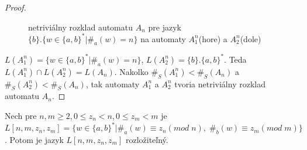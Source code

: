 \begin{proof}
\begin{figure}[H]
\caption{netriviálny rozklad automatu $ A_n $ pre jazyk $ \lbrace b \rbrace.\lbrace w \in \lbrace a,b \rbrace^{*} | \#_a(w)=n \rbrace $ na automaty $ A_1^n $(hore) a $ A_2^n $(dole)}
\label{fig:dec_ba^n}
\end{figure}

$ L(A_1^n) = \lbrace w \in \lbrace a,b \rbrace^{*} | \#_{a}(w) = n \rbrace $, $ L(A_2^n) = \lbrace b \rbrace.\lbrace a,b \rbrace^{*} $. Teda $ L(A_1^n) \cap L(A_2^n) = L(A_n) $.  Nakolko $ \#_{S}(A_1^n) < \#_{S}(A_n) $ a $ \#_{S}(A_2^n) < \#_{S}(A_n) $, tak automaty $ A_1^n $ a $ A_2^n $ tvoria netriviálny rozklad automatu $ A_n $.
\end{proof}

\begin{theorem}
\label{thm:nmz_nz_m}
Nech pre $ n,m \geq 2, 0 \leq z_n < n, 0 \leq z_m < m $ je $ L[n,m,z_n,z_m] = \lbrace w \in \lbrace a,b \rbrace^{*} | \#_a(w) \equiv z_n (mod \; n), \; \#_b(w) \equiv z_m (mod \; m) \rbrace $. Potom je jazyk $ L[n,m,z_n,z_m] $ rozložiteľný.
\end{theorem}

